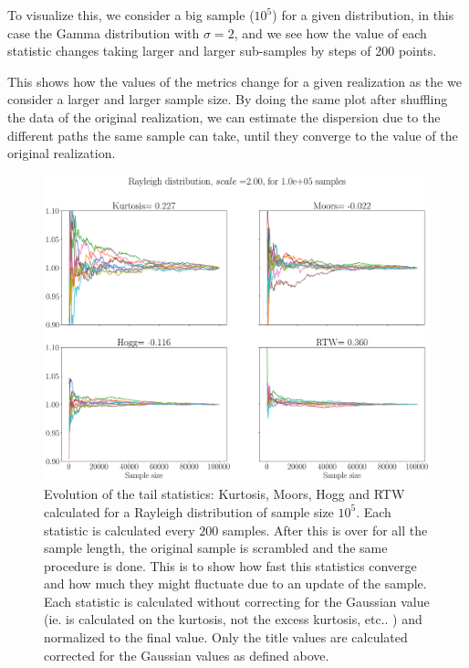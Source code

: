 	To visualize this, we consider a big sample ($10^5$) for a given distribution, in this case the Gamma distribution with $\sigma=2$, and we see how the value of each statistic changes taking larger and larger sub-samples by steps of 200 points. 
	
	This shows how the values of the metrics  change for a given realization as the we consider a larger and larger sample size. 
	By doing the same plot after shuffling the data of the original realization, we can estimate the dispersion due to the different paths  the same sample can take,  until they converge to the value of the original realization. 
	
	
	
	\begin{figure}[htb]
		\centering
		\includegraphics[width=\linewidth]{Images/Metrics/boot_rayleigh_convergence.png}
		\caption{ Evolution of the tail statistics: Kurtosis, Moors, Hogg and RTW calculated for a Rayleigh distribution of sample size $10^5$. 
		Each statistic is calculated every $200$ samples. After this is over for all the sample length, the original sample is scrambled and the same procedure is done. This is to show how fast this statistics converge and how much they might fluctuate due to an update of the sample. 
		Each statistic is calculated without correcting for the Gaussian value (ie. is calculated on  the kurtosis, not the excess kurtosis, etc.. ) and normalized to the final value. Only the title values are calculated corrected for the Gaussian values as defined above.	
		}
		\label{fig:convergence_1}
	\end{figure}
	
